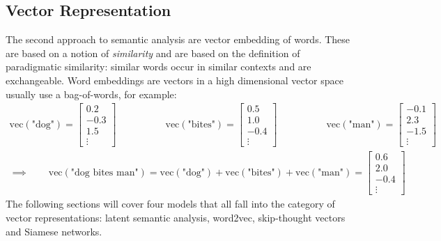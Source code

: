 		\subsection{Vector Representation}
			The second approach to semantic analysis are vector embedding of words. These are based on a notion of \emph{similarity} and are based on the definition of paradigmatic similarity: similar words occur in similar contexts and are exchangeable. Word embeddings are vectors in a high dimensional vector space usually use a bag-of-words, for example:
			\begin{gather}
				\mathrm{vec}(\text{"dog"}) = \begin{bmatrix} 0.2 \\ -0.3 \\ 1.5 \\ \vdots \end{bmatrix} \qquad\qquad\quad
				\mathrm{vec}(\text{"bites"}) = \begin{bmatrix} 0.5 \\ 1.0 \\ -0.4 \\ \vdots \end{bmatrix} \qquad\qquad\quad
				\mathrm{vec}(\text{"man"}) = \begin{bmatrix} -0.1 \\ 2.3 \\ -1.5 \\ \vdots \end{bmatrix} \\
				\implies\qquad
				\mathrm{vec}(\text{"dog bites man"})
					= \mathrm{vec}(\text{"dog"}) + \mathrm{vec}(\text{"bites"}) + \mathrm{vec}(\text{"man"})
					= \begin{bmatrix} 0.6 \\ 2.0 \\ -0.4 \\ \vdots \end{bmatrix}
			\end{gather}
			The following sections will cover four models that all fall into the category of vector representations: latent semantic analysis, word2vec, skip-thought vectors and Siamese networks.

